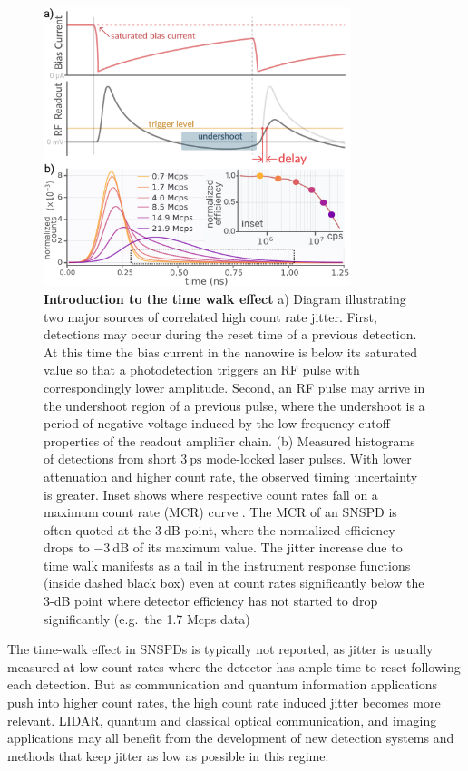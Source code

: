 \documentclass[11pt]{caltech_thesis} %
\begin{document}
\hypertarget{fig:intro_jitterate}{%
\begin{figure}
\centering
\includegraphics[width=0.8\textwidth,height=\textheight]{chapter_02/figs_02/intro_jitterate_light.pdf}
\caption[{Introduction to the time walk effect}]{\textbf{Introduction to
the time walk effect} a) Diagram illustrating two major sources of
correlated high count rate jitter. First, detections may occur during
the reset time of a previous detection. At this time the bias current in
the nanowire is below its saturated value so that a photodetection
triggers an RF pulse with correspondingly lower amplitude. Second, an RF
pulse may arrive in the undershoot region of a previous pulse, where the
undershoot is a period of negative voltage induced by the low-frequency
cutoff properties of the readout amplifier chain. (b) Measured
histograms of detections from short $3~\mathrm{ps}$ mode-locked laser
pulses. With lower attenuation and higher count rate, the observed
timing uncertainty is greater. Inset shows where respective count rates
fall on a maximum count rate (MCR) curve \autocite{Zhang_MCR_2019}. The
MCR of an SNSPD is often quoted at the $3~\mathrm{dB}$ point, where the
normalized efficiency drops to $-3~\mathrm{dB}$ of its maximum value.
The jitter increase due to time walk manifests as a tail in the
instrument response functions (inside dashed black box) even at count
rates significantly below the 3-dB point where detector efficiency has
not started to drop significantly (e.g.~the 1.7 Mcps data)}
\label{fig:intro_jitterate}
\end{figure}
}

The time-walk effect in SNSPDs is typically not reported, as jitter is
usually measured at low count rates where the detector has ample time to
reset following each detection. But as communication and quantum
information applications push into higher count rates, the high count
rate induced jitter becomes more relevant. LIDAR, quantum and classical
optical communication, and imaging applications may all benefit from the
development of new detection systems and methods that keep jitter as low
as possible in this regime.
\end{document}
